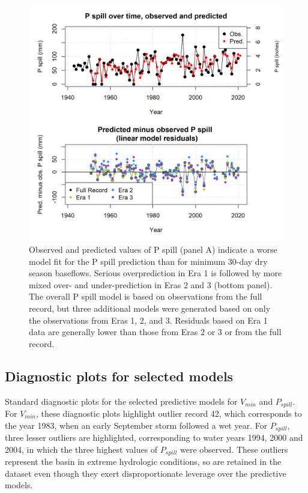 \documentclass[hess, manuscript]{copernicus}
\begin{document}
\begin{figure}
\includegraphics[width=1\linewidth]{f16} \caption{\label{fig:pspill_pred_over_time} Observed and predicted values of P spill (panel A) indicate a worse model fit for the P spill prediction than for minimum 30-day dry season baseflows. Serious overprediction in Era 1 is followed by more mixed over- and under-prediction in Eras 2 and 3 (bottom panel). The overall P spill model is based on observations from the full record, but three additional models were generated based on only the observations from Eras 1, 2, and 3. Residuals based on Era 1 data are generally lower than those from Eras 2 or 3 or from the full record.}\label{fig:pspill_pred_over_time}
\end{figure}

\subsection{Diagnostic plots for selected models}

Standard diagnostic plots for the selected predictive models for
\(V_{min}\) and \(P_{spill}\). For \(V_{min}\), these diagnostic plots
highlight outlier record 42, which corresponds to the year 1983, when an
early September storm followed a wet year. For \(P_{spill}\), three
lesser outliers are highlighted, corresponding to water years 1994, 2000
and 2004, in which the three highest values of \(P_{spill}\) were
observed. These outliers represent the basin in extreme hydrologic
conditions, so are retained in the dataset even though they exert
disproportionate leverage over the predictive models.
\end{document}
